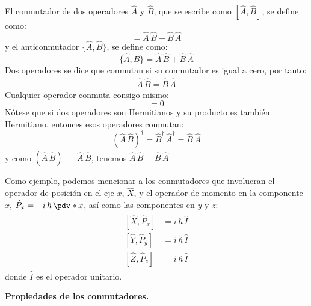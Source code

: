 El conmutador de dos operadores $\hat{A}$  y $\hat{B}$, que se escribe como $[\hat{A}, \hat{B}]$, se define como:
\begin{equation}
[\hat{A}, \hat{B}] = \hat{A} \, \hat{B} - \hat{B} \, \hat{A}
\label{eq:ecuacion_02_79}
\end{equation}
y el anticonmutador $\{ \hat{A}, \hat{B} \}$, se define como:
\begin{equation}
\{ \hat{A}, \hat{B} \} = \hat{A} \, \hat{B} + \hat{B} \, \hat{A}
\label{eq:ecuacion_02_80}
\end{equation}
Dos operadores se dice que conmutan si su conmutador es igual a cero, por tanto:
\begin{align*}
\hat{A} \, \hat{B} = \hat{B} \, \hat{A}
\end{align*}
Cualquier operador conmuta consigo mismo:
\begin{equation}
[\hat{A}, \hat{A}] = 0
\label{eq:ecuacion_02_81}
\end{equation}
Nótese que si dos operadores son Hermitianos y su producto es también Hermitiano, entonces esos operadores conmutan:
\begin{equation}
(\hat{A} \, \hat{B})^{\dagger} = \hat{B}^{\dagger} \, \hat{A}^{\dagger} = \hat{B} \, \hat{A}
\label{eq:ecuacion_02_82}
\end{equation}
y como $(\hat{A} \, \hat{B})^{\dagger} = \hat{A} \, \hat{B}$, tenemos $\hat{A} \, \hat{B} = \hat{B} \, \hat{A}$
\par
Como ejemplo, podemos mencionar a los conmutadores que involucran el operador de posición en el eje $x$, $\hat{X}$, y el operador de momento en la componente $x$, $\hat{P}_{x} = - i \, \hbar \, \pdv*{x}$, así como las componentes en $y$ y $z$:
\begin{align}
\begin{aligned}
[\hat{X}, \hat{P}_{x}] &= i \, \hbar \, \hat{I} \\
[\hat{Y}, \hat{P}_{y}] &= i \, \hbar \, \hat{I} \\
[\hat{Z}, \hat{P}_{z}] &= i \, \hbar \, \hat{I}
\end{aligned}
\label{eq:ecuacion_02_83}
\end{align}
donde $\hat{I}$ es el operador unitario.

\textbf{Propiedades de los conmutadores.}

